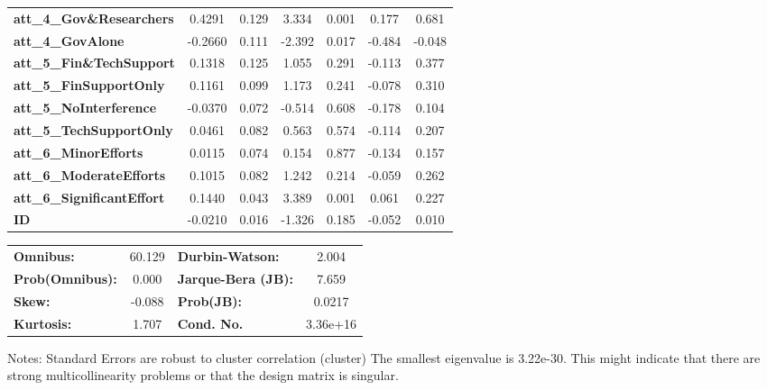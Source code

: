 \begin{center}
\begin{tabular}{lcccccc}
\textbf{att\_4\_Gov\&Researchers}           &       0.4291  &        0.129     &     3.334  &         0.001        &        0.177    &        0.681     \\
\textbf{att\_4\_GovAlone}                   &      -0.2660  &        0.111     &    -2.392  &         0.017        &       -0.484    &       -0.048     \\
\textbf{att\_5\_Fin\&TechSupport}           &       0.1318  &        0.125     &     1.055  &         0.291        &       -0.113    &        0.377     \\
\textbf{att\_5\_FinSupportOnly}             &       0.1161  &        0.099     &     1.173  &         0.241        &       -0.078    &        0.310     \\
\textbf{att\_5\_NoInterference}             &      -0.0370  &        0.072     &    -0.514  &         0.608        &       -0.178    &        0.104     \\
\textbf{att\_5\_TechSupportOnly}            &       0.0461  &        0.082     &     0.563  &         0.574        &       -0.114    &        0.207     \\
\textbf{att\_6\_MinorEfforts}               &       0.0115  &        0.074     &     0.154  &         0.877        &       -0.134    &        0.157     \\
\textbf{att\_6\_ModerateEfforts}            &       0.1015  &        0.082     &     1.242  &         0.214        &       -0.059    &        0.262     \\
\textbf{att\_6\_SignificantEffort}          &       0.1440  &        0.043     &     3.389  &         0.001        &        0.061    &        0.227     \\
\textbf{ID}                                 &      -0.0210  &        0.016     &    -1.326  &         0.185        &       -0.052    &        0.010     \\
\bottomrule
\end{tabular}
\begin{tabular}{lclc}
\textbf{Omnibus:}       & 60.129 & \textbf{  Durbin-Watson:     } &    2.004  \\
\textbf{Prob(Omnibus):} &  0.000 & \textbf{  Jarque-Bera (JB):  } &    7.659  \\
\textbf{Skew:}          & -0.088 & \textbf{  Prob(JB):          } &   0.0217  \\
\textbf{Kurtosis:}      &  1.707 & \textbf{  Cond. No.          } & 3.36e+16  \\
\bottomrule
\end{tabular}
\end{center}

Notes: \newline
 [1] Standard Errors are robust to cluster correlation (cluster) \newline
 [2] The smallest eigenvalue is 3.22e-30. This might indicate that there are \newline
 strong multicollinearity problems or that the design matrix is singular.